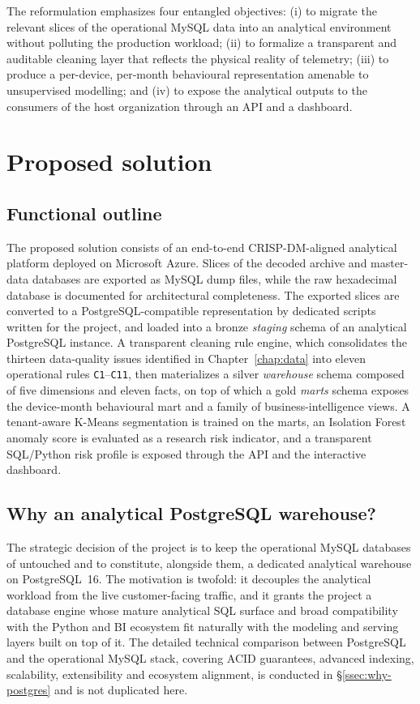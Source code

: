 The reformulation emphasizes four entangled objectives: (i) to migrate the relevant slices of the operational MySQL data into an analytical environment without polluting the production workload; (ii) to formalize a transparent and auditable cleaning layer that reflects the physical reality of telemetry; (iii) to produce a per-device, per-month behavioural representation amenable to unsupervised modelling; and (iv) to expose the analytical outputs to the consumers of the host organization through an API and a dashboard.

\section{Proposed solution}

\subsection{Functional outline}
The proposed solution consists of an end-to-end CRISP-DM-aligned analytical platform deployed on Microsoft Azure. Slices of the decoded archive and master-data databases are exported as MySQL dump files, while the raw hexadecimal database is documented for architectural completeness. The exported slices are converted to a PostgreSQL-compatible representation by dedicated scripts written for the project, and loaded into a bronze \emph{staging} schema of an analytical PostgreSQL instance. A transparent cleaning rule engine, which consolidates the thirteen data-quality issues identified in Chapter~\ref{chap:data} into eleven operational rules \texttt{C1}--\texttt{C11}, then materializes a silver \emph{warehouse} schema composed of five dimensions and eleven facts, on top of which a gold \emph{marts} schema exposes the device-month behavioural mart and a family of business-intelligence views. A tenant-aware K-Means segmentation is trained on the marts, an Isolation Forest anomaly score is evaluated as a research risk indicator, and a transparent SQL/Python risk profile is exposed through the API and the interactive dashboard.

\subsection{Why an analytical PostgreSQL warehouse?}
The strategic decision of the project is to keep the operational MySQL databases of \hostorg{} untouched and to constitute, alongside them, a dedicated analytical warehouse on PostgreSQL~16. The motivation is twofold: it decouples the analytical workload from the live customer-facing traffic, and it grants the project a database engine whose mature analytical SQL surface and broad compatibility with the Python and BI ecosystem fit naturally with the modeling and serving layers built on top of it. The detailed technical comparison between PostgreSQL and the operational MySQL stack, covering ACID guarantees, advanced indexing, scalability, extensibility and ecosystem alignment, is conducted in §\ref{ssec:why-postgres} and is not duplicated here.

